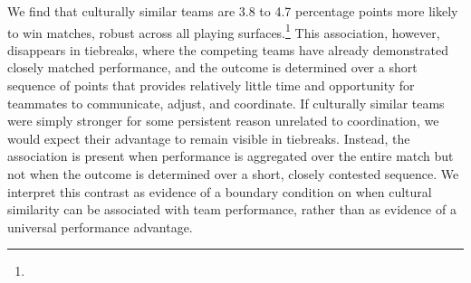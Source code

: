\documentclass[10pt]{article}
\begin{document}
We find that culturally similar teams are 3.8 to 4.7 percentage points more likely to win  matches, robust across all playing surfaces.\footnote{} This association, however, disappears in tiebreaks, where the competing teams have already demonstrated closely matched performance, and the outcome is determined over a short sequence of points that provides relatively little time and opportunity for teammates to communicate, adjust, and coordinate. %
If culturally similar teams were simply stronger for some persistent reason unrelated to coordination, we would expect their advantage to remain visible in tiebreaks. Instead, the association is present when performance is aggregated over the entire match but not when the outcome is determined over a short, closely contested sequence. We interpret this contrast as evidence of a boundary condition on when cultural similarity can be associated with team performance, rather than as evidence of a universal performance advantage.



\end{document}
